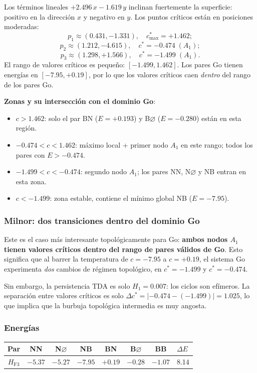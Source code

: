 \documentclass[11pt,a4paper]{article}
\newcommand{\dE}{\Delta E}
\begin{document}
Los términos lineales $+2.496\,x - 1.619\,y$ inclinan fuertemente la
superficie: positivo en la dirección $x$ y negativo en $y$.
Los puntos críticos están en posiciones moderadas:
\[
  p_1 \approx (0.431,-1.331),\quad c^*_{\max}=+1.462;
\]
\[
  p_2 \approx (1.212,-4.615),\quad c^*=-0.474\;(A_1);
\]
\[
  p_3 \approx (1.298,+1.566),\quad c^*=-1.499\;(A_1).
\]
El rango de valores críticos es pequeño: $[-1.499, 1.462]$.
Los pares Go tienen energías en $[-7.95, +0.19]$, por lo que los
valores críticos caen \emph{dentro} del rango de los pares Go.

\textbf{Zonas y su intersección con el dominio Go}:
\begin{itemize}[noitemsep]
  \item $c > 1.462$: solo el par BN ($E=+0.193$) y
        B$\varnothing$ ($E=-0.280$) están en esta región.
  \item $-0.474 < c < 1.462$: máximo local + primer nodo $A_1$ en este
        rango; todos los pares con $E > -0.474$.
  \item $-1.499 < c < -0.474$: segundo nodo $A_1$; los pares NN, N$\varnothing$
        y NB entran en esta zona.
  \item $c < -1.499$: zona estable, contiene el mínimo global NB ($E=-7.95$).
\end{itemize}

\subsubsection*{Milnor: dos transiciones dentro del dominio Go}

Este es el caso más interesante topológicamente para Go:
\textbf{ambos nodos $A_1$ tienen valores críticos dentro del rango de
pares válidos de Go}.
Esto significa que al barrer la temperatura de $c=-7.95$ a $c=+0.19$,
el sistema Go experimenta \emph{dos} cambios de régimen topológico,
en $c^*=-1.499$ y $c^*=-0.474$.

Sin embargo, la persistencia TDA es solo $H_1=0.007$: los ciclos son
efímeros. La separación entre valores críticos es solo
$\Delta c^* = |-0.474-(-1.499)|=1.025$, lo que implica que la
burbuja topológica intermedia es muy angosta.

\subsubsection*{Energías}

\begin{center}
\begin{tabular}{ccccccc}
  \toprule
  Par & NN & N$\varnothing$ & NB & BN & B$\varnothing$ & BB & $\dE$ \\
  \midrule
  $H_{\text{F3}}$ & $-5.37$ & $-5.27$ & $-7.95$ & $+0.19$ & $-0.28$ & $-1.07$ & 8.14 \\
  \bottomrule
\end{tabular}
\end{center}
\end{document}
